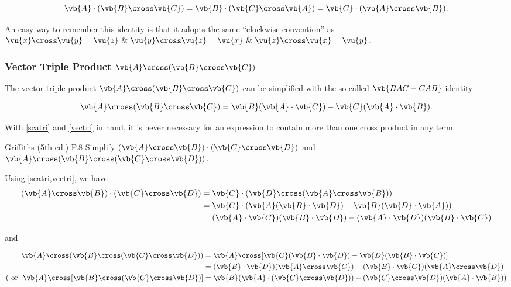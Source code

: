 \documentclass[a4paper,12pt]{report}
\begin{document}
\begin{equation} 
  \vb{A} \cdot (\vb{B} \cross \vb{C}) = \vb{B} \cdot (\vb{C} \cross \vb{A}) = \vb{C} \cdot (\vb{A} \cross \vb{B}). \label{scatri} 
\end{equation}
	
An easy way to remember this identity is that it adopts the same ``clockwise convention'' as \(\vu{x} \cross \vu{y} = \vu{z} ~  \&  ~ \vu{y} \cross \vu{z} = \vu{x} ~  \&  ~ \vu{z} \cross \vu{x} = \vu{y}\).
	

\subsubsection{Vector Triple Product \(\vb{A} \cross (\vb{B} \cross \vb{C})\)}
	
The vector triple product \(\vb{A} \cross (\vb{B} \cross \vb{C})\) can be simplified with the so-called \(\vb{BAC-CAB}\) identity
	
\begin{equation} 
	\vb{A} \cross (\vb{B} \cross \vb{C}) = \vb{B}(\vb{A} \cdot \vb{C}) - \vb{C}(\vb{A} \cdot \vb{B}). \label{vectri} 
\end{equation}		
	
With \cref{scatri} and \cref{vectri} in hand, it is never necessary for an expression to contain more than one cross product in any term.
	
\example
{Griffiths (5th ed.) P.8}
{Simplify \((\vb{A} \cross \vb{B}) \cdot (\vb{C} \cross \vb{D})\) and \(\vb{A} \cross (\vb{B} \cross (\vb{C} \cross \vb{D}))\).}
{Using \cref{scatri,vectri}, we have 
\begin{equation} 
	\begin{aligned} 
		(\vb{A} \cross \vb{B}) \cdot (\vb{C} \cross \vb{D}) &= \vb{C} \cdot (\vb{D} \cross (\vb{A} \cross \vb{B})) \\ 
			&= \vb{C} \cdot (\vb{A}(\vb{B} \cdot \vb {D}) - \vb{B}(\vb{D} \cdot \vb{A}))  \\
			&= (\vb{A} \cdot \vb{C})(\vb{B} \cdot \vb{D}) - (\vb{A} \cdot \vb{D})(\vb{B} \cdot \vb{C}) 
	\end{aligned} 
\end{equation}

and 

\begin{equation} 
	\begin{aligned} 
		\vb{A} \cross (\vb{B} \cross (\vb{C} \cross \vb{D})) &= \vb{A} \cross[\vb{C}(\vb{B} \cdot \vb{D}) - \vb{D}(\vb{B} \cdot \vb{C})]  \\
			&= (\vb{B} \cdot \vb{D})(\vb{A} \cross \vb{C}) - (\vb{B} \cdot \vb{C})(\vb{A} \cross \vb{D}) \\
			(\text { or }  ~ \vb{A} \cross [\vb{B} \cross (\vb{C} \cross \vb{D})] &= \vb{B}(\vb{A} \cdot (\vb{C} \cross \vb{D})) - (\vb{C} \cross \vb{D})(\vb{A} \cdot \vb{B}))
	\end{aligned} 
\end{equation}}
\end{document}
